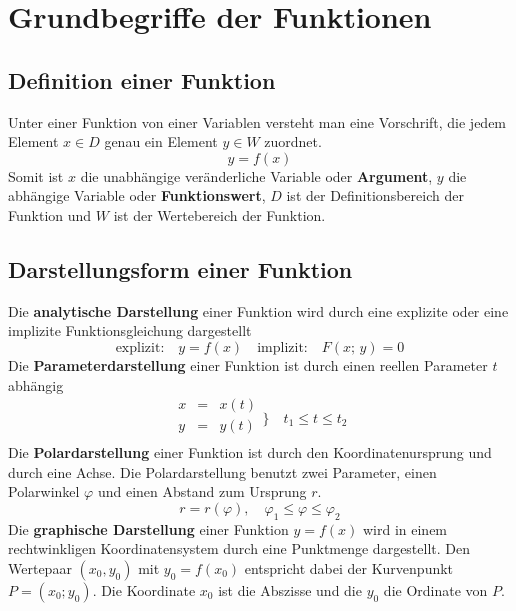 \section{Grundbegriffe der Funktionen}
\subsection{Definition einer Funktion}
Unter einer Funktion von einer Variablen versteht man eine Vorschrift, die jedem Element $x\in D$ genau ein Element $y\in W$ zuordnet. 
\begin{equation}
\boxed{y=f\left(x\right)}
\end{equation}
Somit ist $x$ die unabhängige veränderliche Variable oder \textbf{Argument}, $y$ die abhängige Variable oder \textbf{Funktionswert}, $D$ ist der Definitionsbereich der Funktion und $W$ ist der Wertebereich der Funktion.
\subsection{Darstellungsform einer Funktion}
Die \textbf{analytische Darstellung} einer Funktion wird durch eine explizite oder eine implizite Funktionsgleichung dargestellt
\begin{equation}
\boxed{\text{explizit:}\quad y=f\left(x\right)}\quad \boxed{\text{implizit:}\quad F\left(x;\,y\right)=0} 
\end{equation}
Die \textbf{Parameterdarstellung} einer Funktion ist durch einen reellen Parameter $t$ abhängig
\begin{equation}
\boxed{\begin{array}{lll}x&=&x\left(t\right)\\y&=&y\left(t\right)\\\end{array}\Big\}\quad t_1\leq t\leq t_2}
\end{equation}
Die \textbf{Polardarstellung} einer Funktion ist durch den Koordinatenursprung und durch eine Achse. Die Polardarstellung benutzt zwei Parameter, einen Polarwinkel $\varphi$ und einen Abstand zum Ursprung $r$.
\begin{equation}
\boxed{r=r\left(\varphi\right),\quad \varphi_1\leq \varphi\leq \varphi_2}
\end{equation}
Die \textbf{graphische Darstellung} einer Funktion $y=f\left(x\right)$ wird in einem rechtwinkligen Koordinatensystem durch eine Punktmenge dargestellt. Den Wertepaar $\left(x_0,y_0\right)$ mit $y_0=f\left(x_0\right)$ entspricht dabei der Kurvenpunkt $P=\left(x_0; y_0\right)$. Die Koordinate $x_0$ ist die Abszisse und die $y_0$ die Ordinate von $P$.
